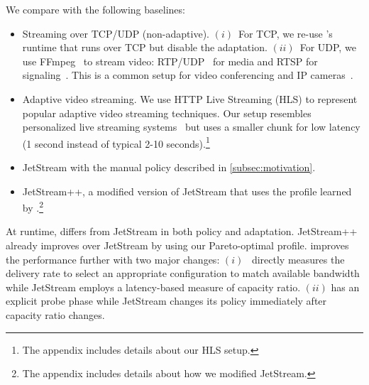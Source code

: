 We compare \sysname{} with the following baselines:

\begin{itemize}[noitemsep, nolistsep, leftmargin=*]

\item Streaming over TCP/UDP (non-adaptive). $(i)$~For TCP, we re-use
  \sysname{}'s runtime that runs over TCP but disable the adaptation. $(ii)$~For
  UDP, we use FFmpeg~\cite{bellard2012ffmpeg} to stream video:
  RTP/UDP~\cite{schulzrinne2006rtp} for media and RTSP for
  signaling~\cite{schulzrinne1998rtsp}. This is a common setup for video
  conferencing and IP cameras~\cite{durresi2005rtp, king2009cisco}.

\item Adaptive video streaming. We use HTTP Live Streaming (HLS) to represent
  popular adaptive video streaming techniques. Our setup resembles personalized
  live streaming systems~\cite{wang2016anatomy} but uses a smaller chunk for low
  latency (1 second instead of typical 2-10 seconds).\footnote{The appendix
    includes details about our HLS setup.}

\item JetStream with the manual policy described in \autoref{subsec:motivation}.

\item JetStream++, a modified version of JetStream that uses the profile learned
  by \sysname{}.\footnote{The appendix includes details about how we modified
    JetStream.}

\end{itemize}

At runtime, \sysname{} differs from JetStream in both policy and
adaptation. JetStream++ already improves over JetStream by using our
Pareto-optimal profile. \sysname{} improves the performance further with two
major changes: $(i)$~\sysname{} directly measures the delivery rate to select an
appropriate configuration to match available bandwidth while JetStream employs a
latency-based measure of capacity ratio. $(ii)$ \sysname{} has an explicit probe
phase while JetStream changes its policy immediately after capacity ratio
changes.

